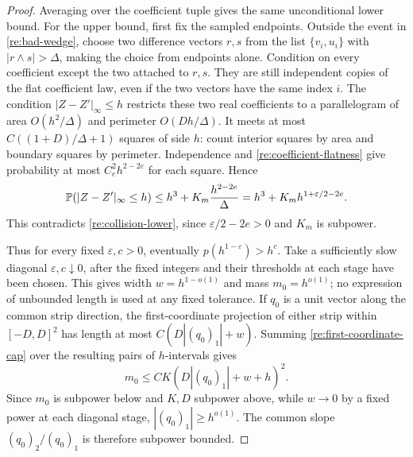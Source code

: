 \begin{proof}
Averaging over the coefficient tuple gives the same unconditional
lower bound.  For the upper bound, first fix the sampled endpoints.
Outside the event in \eqref{re:bad-wedge}, choose two difference
vectors \(r,s\) from the list \(\{v_i,u_i\}\) with
\(|r\wedge s|>\Delta\), making the choice from endpoints alone.
Condition on every coefficient except the two attached to \(r,s\).
They are still independent copies of the flat coefficient law,
even if the two vectors have the same index \(i\).  The condition
\(|Z-Z'|_\infty\le h\) restricts these two real coefficients to a
parallelogram of area \(O(h^2/\Delta)\) and perimeter
\(O(Dh/\Delta)\).  It meets at most
\(C((1+D)/\Delta+1)\) squares of side \(h\): count interior squares
by area and boundary squares by perimeter.  Independence and
\eqref{re:coefficient-flatness} give probability at most
\(C_e^2h^{2-2e}\) for each square.  Hence
\begin{equation}\label{re:collision-upper}
 \mathbb P(|Z-Z'|_\infty\le h)
 \le h^3+K_m\frac{h^{2-2e}}{\Delta}
 =h^3+K_mh^{1+\varepsilon/2-2e}.
\end{equation}
This contradicts \eqref{re:collision-lower}, since
\(\varepsilon/2-2e>0\) and \(K_m\) is subpower.

Thus for every fixed \(\varepsilon,c>0\), eventually
\(p(h^{1-\varepsilon})>h^c\).  Take a sufficiently slow diagonal
\(\varepsilon,c\downarrow0\), after the fixed integers and their
thresholds at each stage have been chosen.  This gives width
\(w=h^{1-o(1)}\) and mass \(m_0=h^{o(1)}\); no expression of
unbounded length is used at any fixed tolerance.
If \(q_0\) is a unit vector along the common strip direction,
the first-coordinate projection of either strip within \([-D,D]^2\)
has length at most \(C(D|(q_0)_1|+w)\).  Summing
\eqref{re:first-coordinate-cap} over the resulting pairs of
\(h\)-intervals gives
\[
 m_0\le CK(D|(q_0)_1|+w+h)^2.
\]
Since \(m_0\) is subpower below and \(K,D\) subpower above, while
\(w\to0\) by a fixed power at each diagonal stage,
\(|(q_0)_1|\ge h^{o(1)}\).  The common slope
\((q_0)_2/(q_0)_1\) is therefore subpower bounded.
\end{proof}


